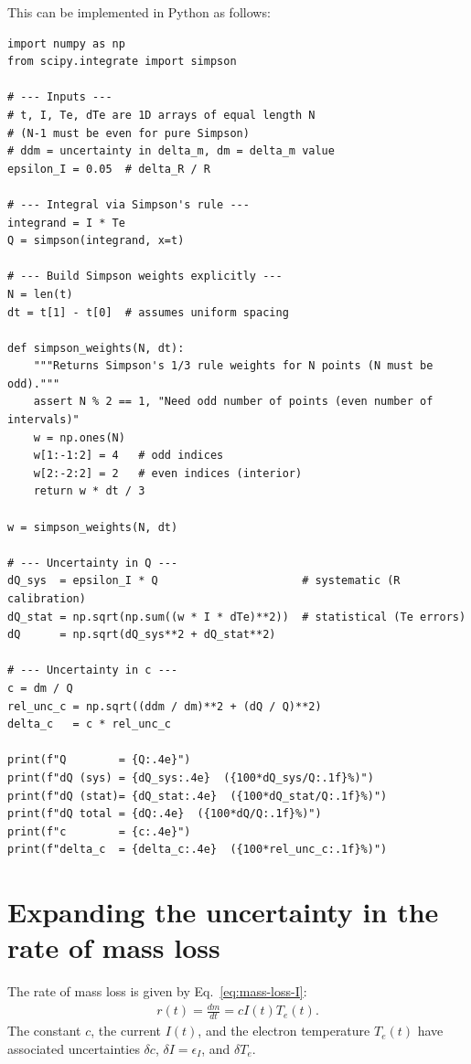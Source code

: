 \documentclass[11pt,twoside]{article}
\begin{document}
This can be implemented in Python as follows:
\begin{lstlisting}[caption={Example implementation of $\delta Q$ in Python}]
import numpy as np
from scipy.integrate import simpson

# --- Inputs ---
# t, I, Te, dTe are 1D arrays of equal length N 
# (N-1 must be even for pure Simpson)
# ddm = uncertainty in delta_m, dm = delta_m value
epsilon_I = 0.05  # delta_R / R

# --- Integral via Simpson's rule ---
integrand = I * Te
Q = simpson(integrand, x=t)

# --- Build Simpson weights explicitly ---
N = len(t)
dt = t[1] - t[0]  # assumes uniform spacing

def simpson_weights(N, dt):
    """Returns Simpson's 1/3 rule weights for N points (N must be odd)."""
    assert N % 2 == 1, "Need odd number of points (even number of intervals)"
    w = np.ones(N)
    w[1:-1:2] = 4   # odd indices
    w[2:-2:2] = 2   # even indices (interior)
    return w * dt / 3

w = simpson_weights(N, dt)

# --- Uncertainty in Q ---
dQ_sys  = epsilon_I * Q                      # systematic (R calibration)
dQ_stat = np.sqrt(np.sum((w * I * dTe)**2))  # statistical (Te errors)
dQ      = np.sqrt(dQ_sys**2 + dQ_stat**2)

# --- Uncertainty in c ---
c = dm / Q
rel_unc_c = np.sqrt((ddm / dm)**2 + (dQ / Q)**2)
delta_c   = c * rel_unc_c

print(f"Q        = {Q:.4e}")
print(f"dQ (sys) = {dQ_sys:.4e}  ({100*dQ_sys/Q:.1f}%)")
print(f"dQ (stat)= {dQ_stat:.4e}  ({100*dQ_stat/Q:.1f}%)")
print(f"dQ total = {dQ:.4e}  ({100*dQ/Q:.1f}%)")
print(f"c        = {c:.4e}")
print(f"delta_c  = {delta_c:.4e}  ({100*rel_unc_c:.1f}%)")
\end{lstlisting}

\section{Expanding the uncertainty in the rate of mass loss}
The rate of mass loss is given by Eq.~\eqref{eq:mass-loss-I}:
\begin{align}
r(t) = \frac{dm}{dt} = c I(t) T_e(t). \label{eq:mass-loss-rate}
\end{align}
The constant $c$, the current $I(t)$, and the electron temperature $T_e(t)$ have associated uncertainties $\delta c$, $\delta I = \epsilon_I $, and $\delta T_e$.
\end{document}
